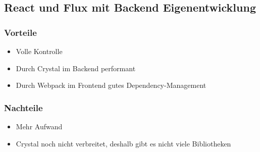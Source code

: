 \subsection{React und Flux mit Backend Eigenentwicklung}
\label{ssec:el-react-und-flux-mit-backend-eigenentwicklung}

\subsubsection{Vorteile}
\label{sssec:ele-vorteile}

\begin{itemize}
	\item Volle Kontrolle
	\item Durch Crystal im Backend performant
	\item Durch Webpack im Frontend gutes Dependency-Management
\end{itemize}

\subsubsection{Nachteile}
\label{sssec:ele-nachteile}

\begin{itemize}
	\item Mehr Aufwand
	\item Crystal noch nicht verbreitet, deshalb gibt es nicht viele
		Bibliotheken
\end{itemize}
